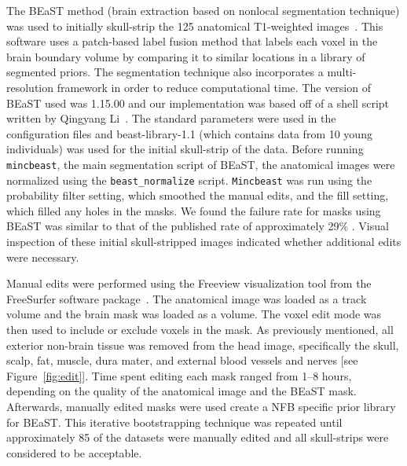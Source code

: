 \par The BEaST method (brain extraction based on nonlocal segmentation technique) was used to initially skull-strip the 125 anatomical T1-weighted images~\cite{Eskildsen2012}. This software uses a patch-based label fusion method that labels each voxel in the brain boundary volume by comparing it to similar locations in a library of segmented priors. The segmentation technique also incorporates a multi-resolution framework in order to reduce computational time. The version of BEaST used was 1.15.00 and our implementation was based off of a shell script written by Qingyang Li~\cite{rpubs}. The standard parameters were used in the configuration files and beast-library-1.1 (which contains data from 10 young individuals) was used for the initial skull-strip of the data. Before running {\tt mincbeast}, the main segmentation script of BEaST, the anatomical images were normalized using the {\tt beast\_normalize} script. {\tt Mincbeast} was run using the probability filter setting, which smoothed the manual edits, and the fill setting, which filled any holes in the masks. We found the failure rate for masks using BEaST was similar to that of the published rate of approximately 29\% \cite{Eskildsen2012}. Visual inspection of these initial skull-stripped images indicated whether additional edits were necessary.

\par Manual edits were performed using the Freeview visualization tool from the FreeSurfer software package~\cite{Fischl2012}. The anatomical image was loaded as a track volume and the brain mask was loaded as a volume. The voxel edit mode was then used to include or exclude voxels in the mask. As previously mentioned, all exterior non-brain tissue was removed from the head image, specifically the skull, scalp, fat, muscle, dura mater, and external blood vessels and nerves [see Figure~\ref{fig:edit}]. Time spent editing each mask ranged from 1--8 hours, depending on the quality of the anatomical image and the BEaST mask. Afterwards, manually edited masks were used create a NFB specific prior library for BEaST. This iterative bootstrapping technique was repeated until approximately 85 of the datasets were manually edited and all skull-strips were considered to be acceptable.

